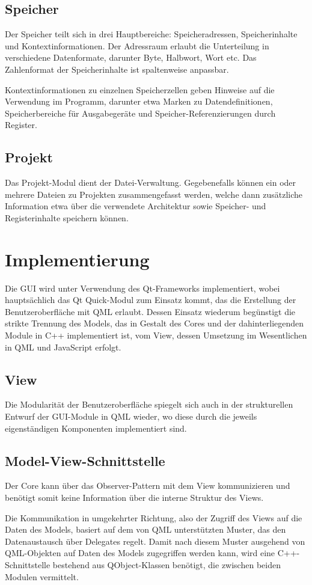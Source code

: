 \subsection{Speicher}

Der Speicher teilt sich in drei Hauptbereiche: Speicheradressen, Speicherinhalte und Kontextinformationen.
Der Adressraum erlaubt die Unterteilung in verschiedene Datenformate, darunter Byte, Halbwort, Wort etc.
Das Zahlenformat der Speicherinhalte ist spaltenweise anpassbar.

Kontextinformationen zu einzelnen Speicherzellen geben Hinweise auf die Verwendung im Programm, darunter etwa Marken zu Datendefinitionen, Speicherbereiche für Ausgabegeräte und Speicher-Referenzierungen durch Register.

\subsection{Projekt}

Das Projekt-Modul dient der Datei-Verwaltung. Gegebenefalls können ein oder mehrere Dateien zu Projekten zusammengefasst werden, welche dann zusätzliche Information etwa über die verwendete Architektur sowie Speicher- und Registerinhalte speichern können.

\section{Implementierung}

Die GUI wird unter Verwendung des Qt-Frameworks implementiert, wobei hauptsächlich das Qt Quick-Modul zum Einsatz kommt, das die Erstellung der Benutzeroberfläche mit QML erlaubt. Dessen Einsatz wiederum begünstigt die strikte Trennung des Models, das in Gestalt des Cores und der dahinterliegenden Module in C++ implementiert ist, vom View, dessen Umsetzung im Wesentlichen in QML und JavaScript erfolgt.

\subsection{View}

Die Modularität der Benutzeroberfläche spiegelt sich auch in der strukturellen Entwurf der GUI-Module in QML wieder, wo diese durch die jeweils eigenständigen Komponenten implementiert sind.

\subsection{Model-View-Schnittstelle}

Der Core kann über das Observer-Pattern mit dem View kommunizieren und benötigt somit keine Information über die interne Struktur des Views.

Die Kommunikation in umgekehrter Richtung, also der Zugriff des Views auf die Daten des Models, basiert auf dem von QML unterstützten Muster, das den Datenaustausch über Delegates regelt. Damit nach diesem Muster ausgehend von QML-Objekten auf Daten des Models zugegriffen werden kann, wird eine C++-Schnittstelle bestehend aus QObject-Klassen benötigt, die zwischen beiden Modulen vermittelt.
